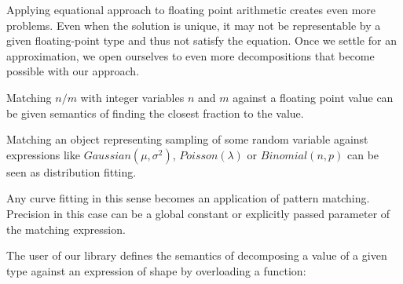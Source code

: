 Applying equational approach to floating point arithmetic creates even more 
problems. Even when the solution is unique, it may not be representable by 
a given floating-point type and thus not satisfy the equation. Once we settle 
for an approximation, we open ourselves to even more decompositions that become 
possible with our approach.

\begin{compactitem}
\setlength{\itemsep}{0pt}
\setlength{\parskip}{0pt}
\item Matching $n/m$ with integer variables $n$ and $m$ against a floating point 
      value can be given semantics of finding the closest fraction to the 
      value.
\item Matching an object representing sampling of some random variable against
      expressions like $Gaussian(\mu,\sigma^2)$, $Poisson(\lambda)$ or 
      $Binomial(n,p)$ can be seen as distribution fitting. 
\item Any curve fitting in this sense becomes an application of pattern 
      matching. Precision in this case can be a global constant or explicitly 
      passed parameter of the matching expression.
\end{compactitem}




\noindent
The user of our library defines the semantics of decomposing a value of a given 
type  against an expression of shape  by overloading a function: 
\\ 

